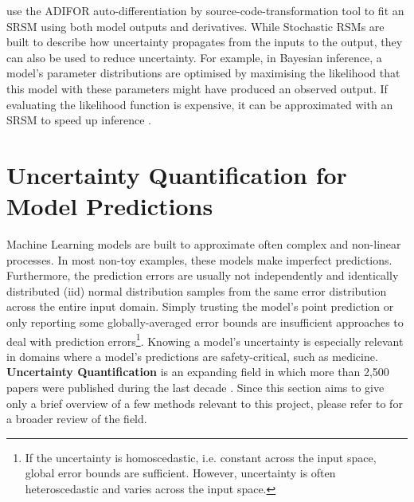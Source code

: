 \textcite{srsm-2004} use the ADIFOR \cite{adifor-1992} auto-differentiation by source-code-transformation tool to fit an SRSM using both model outputs and derivatives. While Stochastic RSMs are built to describe how uncertainty propagates from the inputs to the output, they can also be used to reduce uncertainty. For example, in Bayesian inference, a model's parameter distributions are optimised by maximising the likelihood that this model with these parameters might have produced an observed output. If evaluating the likelihood function is expensive, it can be approximated with an SRSM to speed up inference \cite{srsm-2004}.

\section{Uncertainty Quantification for Model Predictions} \label{txt:uncertainty-quantification}

Machine Learning models are built to approximate often complex and non-linear processes. In most non-toy examples, these models make imperfect predictions. Furthermore, the prediction errors are usually not independently and identically distributed (iid) normal distribution samples from the same error distribution across the entire input domain. Simply trusting the model's point prediction or only reporting some globally-averaged error bounds are insufficient approaches to deal with prediction errors\footnote{If the uncertainty is homoscedastic, i.e. constant across the input space, global error bounds are sufficient. However, uncertainty is often heteroscedastic and varies across the input space.}. Knowing a model's uncertainty is especially relevant in domains where a model's predictions are safety-critical, such as medicine. \textbf{Uncertainty Quantification} is an expanding field in which more than 2,500 papers were published during the last decade \cite{uq-review-2021}. Since this section aims to give only a brief overview of a few methods relevant to this project, please refer to \textcite{uq-review-2021} for a broader review of the field.

